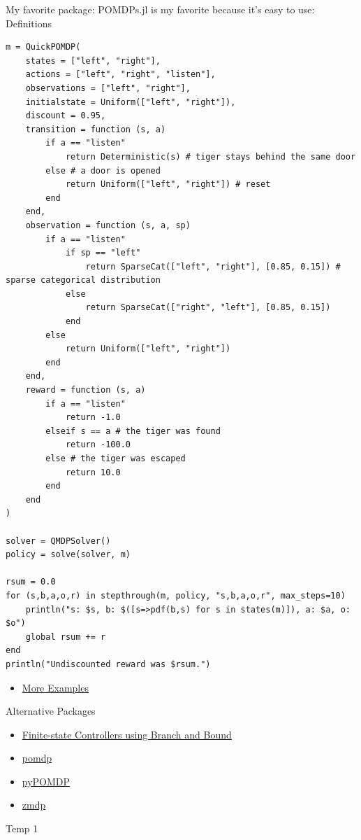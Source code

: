 \documentclass[presentation, smaller]{beamer}
\begin{document}
\begin{frame}[label={sec:org54ffe6b},fragile]{My favorite package: POMDPs.jl is my favorite because it's easy to use: Definitions}
 \begin{verbatim}
m = QuickPOMDP(
    states = ["left", "right"],
    actions = ["left", "right", "listen"],
    observations = ["left", "right"],
    initialstate = Uniform(["left", "right"]),
    discount = 0.95,
    transition = function (s, a)
        if a == "listen"
            return Deterministic(s) # tiger stays behind the same door
        else # a door is opened
            return Uniform(["left", "right"]) # reset
        end
    end,
    observation = function (s, a, sp)
        if a == "listen"
            if sp == "left"
                return SparseCat(["left", "right"], [0.85, 0.15]) # sparse categorical distribution
            else
                return SparseCat(["right", "left"], [0.85, 0.15])
            end
        else
            return Uniform(["left", "right"])
        end
    end,
    reward = function (s, a)
        if a == "listen"
            return -1.0
        elseif s == a # the tiger was found
            return -100.0
        else # the tiger was escaped
            return 10.0
        end
    end
)

solver = QMDPSolver()
policy = solve(solver, m)

rsum = 0.0
for (s,b,a,o,r) in stepthrough(m, policy, "s,b,a,o,r", max_steps=10)
    println("s: $s, b: $([s=>pdf(b,s) for s in states(m)]), a: $a, o: $o")
    global rsum += r
end
println("Undiscounted reward was $rsum.")
\end{verbatim}

\begin{itemize}
\item \href{https://github.com/JuliaPOMDP/POMDPGallery.jl}{More Examples}
\end{itemize}
\end{frame}

\begin{frame}[label={sec:org320694b}]{Alternative Packages}
\begin{itemize}
\item \href{https://www.cs.kent.ac.uk/people/staff/mg483/code/IsoFreeBB/}{Finite-state Controllers using Branch and Bound}
\item \href{https://github.com/mhahsler/pomdp}{pomdp}
\item \href{https://bitbucket.org/bami/pypomdp}{pyPOMDP}
\item \href{https://longhorizon.org/trey/zmdp/}{zmdp}
\end{itemize}
\end{frame}
\begin{frame}[label={sec:orgdfea054}]{Temp 1}
\end{frame}
\end{document}
